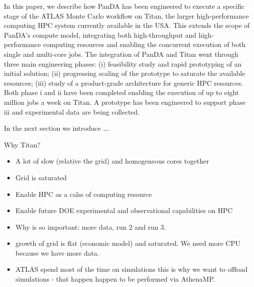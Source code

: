 


In this paper, we describe how PanDA has been engineered to execute a specific
stage of the ATLAS Monte Carlo workflow on Titan, the larger high-performance
computing HPC system currently available in the USA\@. This extends
the scope of PanDA's compute model, integrating both high-throughput and
high-performance computing resources and enabling the concurrent execution of
both  single and multi-core jobs. The integration of PanDA and Titan went
through three main engineering phases: (i) feasibility study and rapid
prototyping of an initial solution; (ii) progressing scaling of the  prototype
to saturate the available resources; (iii) study of a product-grade architecture
for generic HPC resources. Both phase i and ii have been completed enabling the
execution of up to eight million jobs a week on Titan. A prototype has been
engineered to support phase iii and experimental data are being collected.

In the next section we introduce \ldots.

Why Titan?
\begin{itemize}
    \item A lot of slow (relative the grid) and homogeneous cores together
    \item Grid is saturated
    \item Enable HPC as a calss of computing resource
    \item Enable future DOE experimental and observational capabilities on HPC
    \item Why is so important: more data, run 2 and run 3.
    \item growth of grid is flat (economic model) and saturated. We need more CPU because we have more data.
    \item ATLAS spend most of the time on simulations this is why we want to offload simulations - that happen happen to be performed via AthenaMP.
\end{itemize}





